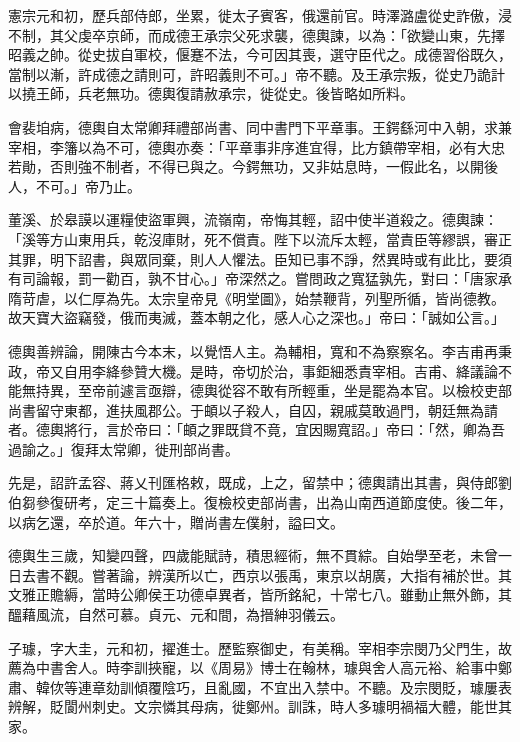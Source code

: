 \begin{pinyinscope}
 憲宗元和初，歷兵部侍郎，坐累，徙太子賓客，俄還前官。時澤潞盧從史詐傲，浸不制，其父虔卒京師，而成德王承宗父死求襲，德輿諫，以為：「欲變山東，先擇昭義之帥。從史拔自軍校，偃蹇不法，今可因其喪，選守臣代之。成德習俗既久，當制以漸，許成德之請則可，許昭義則不可。」帝不聽。及王承宗叛，從史乃詭計以撓王師，兵老無功。德輿復請赦承宗，徙從史。後皆略如所料。



 會裴垍病，德輿自太常卿拜禮部尚書、同中書門下平章事。王鍔繇河中入朝，求兼宰相，李籓以為不可，德輿亦奏：「平章事非序進宜得，比方鎮帶宰相，必有大忠若勛，否則強不制者，不得已與之。今鍔無功，又非姑息時，一假此名，以開後人，不可。」帝乃止。



 董溪、於皋謨以運糧使盜軍興，流嶺南，帝悔其輕，詔中使半道殺之。德輿諫：「溪等方山東用兵，乾沒庫財，死不償責。陛下以流斥太輕，當責臣等繆誤，審正其罪，明下詔書，與眾同棄，則人人懼法。臣知已事不諍，然異時或有此比，要須有司論報，罰一勸百，孰不甘心。」帝深然之。嘗問政之寬猛孰先，對曰：「唐家承隋苛虐，以仁厚為先。太宗皇帝見《明堂圖》，始禁鞭背，列聖所循，皆尚德教。故天寶大盜竊發，俄而夷滅，蓋本朝之化，感人心之深也。」帝曰：「誠如公言。」



 德輿善辨論，開陳古今本末，以覺悟人主。為輔相，寬和不為察察名。李吉甫再秉政，帝又自用李絳參贊大機。是時，帝切於治，事鉅細悉責宰相。吉甫、絳議論不能無持異，至帝前遽言亟辯，德輿從容不敢有所輕重，坐是罷為本官。以檢校吏部尚書留守東都，進扶風郡公。于頔以子殺人，自囚，親戚莫敢過門，朝廷無為請者。德輿將行，言於帝曰：「頔之罪既貸不竟，宜因賜寬詔。」帝曰：「然，卿為吾過諭之。」復拜太常卿，徙刑部尚書。



 先是，詔許孟容、蔣乂刊匯格敕，既成，上之，留禁中；德輿請出其書，與侍郎劉伯芻參復研考，定三十篇奏上。復檢校吏部尚書，出為山南西道節度使。後二年，以病乞還，卒於道。年六十，贈尚書左僕射，謚曰文。



 德輿生三歲，知變四聲，四歲能賦詩，積思經術，無不貫綜。自始學至老，未曾一日去書不觀。嘗著論，辨漢所以亡，西京以張禹，東京以胡廣，大指有補於世。其文雅正贍縟，當時公卿侯王功德卓異者，皆所銘紀，十常七八。雖動止無外飾，其醞藉風流，自然可慕。貞元、元和間，為搢紳羽儀云。



 子璩，字大圭，元和初，擢進士。歷監察御史，有美稱。宰相李宗閔乃父門生，故薦為中書舍人。時李訓挾寵，以《周易》博士在翰林，璩與舍人高元裕、給事中鄭肅、韓佽等連章劾訓傾覆陰巧，且亂國，不宜出入禁中。不聽。及宗閔貶，璩屢表辨解，貶閬州刺史。文宗憐其母病，徙鄭州。訓誅，時人多璩明禍福大體，能世其家。




\end{pinyinscope}
